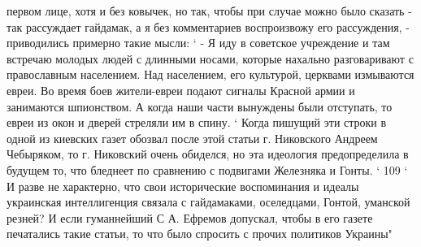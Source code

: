 первом лице, хотя и без ковычек, но так, чтобы при случае можно было сказать - так рассуждает гайдамак, а я без комментариев воспроизвожу его рассуждения, - приводились примерно такие
мысли:
`
- Я иду в советское учреждение и там встречаю молодых
людей с длинными носами, которые нахально разговаривают с
православным населением. Над населением, его культурой, церквами измываются евреи. Во время боев жители-евреи подают сигналы Красной армии и занимаются шпионством. А когда наши части вынуждены были отступать, то евреи из окон и дверей стреляли
им в спину.
`
Когда пишущий эти строки в одной из киевских газет обозвал после этой статьи г. Никовского Андреем Чебыряком, то
г. Никовский очень обиделся, но эта идеология предопределила в будущем то, что бледнеет по сравнению с подвигами Железняка и
Гонты.
`
109
`
И разве не характерно, что свои исторические воспоминания
и идеалы украинская интеллигенция связала с гайдамаками, оселедцами, Гонтой, уманской резней? И если гуманнейший С А. Ефремов допускал, чтобы в его газете печатались такие статьи, то что было спросить с прочих политиков Украины"
